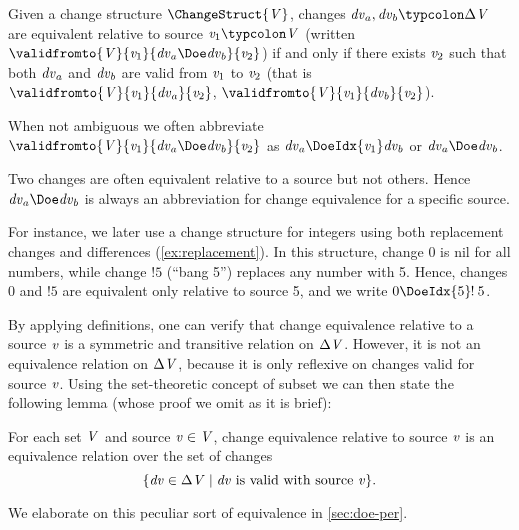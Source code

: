 \begin{definition}
  Given a change structure \ensuremath{\ChangeStruct{\Conid{V}}},
  changes \ensuremath{\Varid{dv}_a,\Varid{dv}_b\typcolon\Delta \Conid{V}} are equivalent relative to source
  \ensuremath{\Varid{v}_{1}\typcolon\Conid{V}} (written \ensuremath{\validfromto{\Conid{V}}{\Varid{v}_{1}}{\Varid{dv}_a\Doe\Varid{dv}_b}{\Varid{v}_{2}}})
  if and only if there exists \ensuremath{\Varid{v}_{2}} such that both \ensuremath{\Varid{dv}_a} and
  \ensuremath{\Varid{dv}_b} are valid from \ensuremath{\Varid{v}_{1}} to \ensuremath{\Varid{v}_{2}} (that is \ensuremath{\validfromto{\Conid{V}}{\Varid{v}_{1}}{\Varid{dv}_a}{\Varid{v}_{2}}}, \ensuremath{\validfromto{\Conid{V}}{\Varid{v}_{1}}{\Varid{dv}_b}{\Varid{v}_{2}}}).
\end{definition}
\begin{notation}
When not ambiguous we often abbreviate \ensuremath{\validfromto{\Conid{V}}{\Varid{v}_{1}}{\Varid{dv}_a\Doe\Varid{dv}_b}{\Varid{v}_{2}}} as \ensuremath{\Varid{dv}_a\;\negthickspace\DoeIdx{\Varid{v}_{1}}\negthickspace\;\Varid{dv}_b} or \ensuremath{\Varid{dv}_a\Doe\Varid{dv}_b}.

Two changes are often equivalent relative to a source but not
others. Hence \ensuremath{\Varid{dv}_a\Doe\Varid{dv}_b} is always an abbreviation for
change equivalence for a specific source.
\end{notation}

\begin{example}
For instance, we later use a change structure for integers using
both replacement changes and differences (\cref{ex:replacement}).
In this structure, change \ensuremath{\mathrm{0}} is nil for all numbers, while
change \ensuremath{\mathbin{!}\mathrm{5}} (``bang 5'') replaces any number with 5. Hence,
changes \ensuremath{\mathrm{0}} and \ensuremath{\mathbin{!}\mathrm{5}} are equivalent only relative to source 5,
and we write \ensuremath{\mathrm{0}\;\negthickspace\DoeIdx{\mathrm{5}}\negthickspace\mathbin{!}\mathrm{5}}.
\end{example}

By applying definitions, one can verify that change equivalence
relative to a source \ensuremath{\Varid{v}} is a symmetric and transitive relation on \ensuremath{\Delta \Conid{V}}.
However, it is not an equivalence relation on \ensuremath{\Delta \Conid{V}}, because it is only
reflexive on changes valid for source \ensuremath{\Varid{v}}. Using the set-theoretic concept of
subset we can then state the following lemma (whose proof we omit as it is
brief):
\begin{lemma}
  \label{doe:equiv-valid}
  For each set \ensuremath{\Conid{V}} and source \ensuremath{\Varid{v}\in \Conid{V}}, change equivalence
  relative to source \ensuremath{\Varid{v}} is an equivalence relation over the set
  of changes \[\{\mathit{dv}\in \Delta \mathit{V}\mid\mathit{dv} \text{ is valid with source } \mathit{v}\}.\]
\end{lemma}
We elaborate on this peculiar sort of equivalence in \cref{sec:doe-per}.

